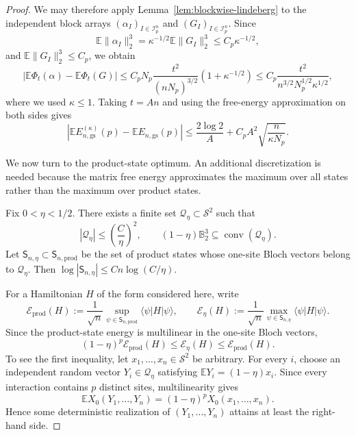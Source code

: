 \documentclass[12pt]{article}
\newcommand{\E}{\mathbb{E}}
\newcommand{\B}{\mathbb{B}}
\newcommand{\mcI}{\mathcal{I}}
\newcommand{\mcS}{\mathcal{S}}
\begin{document}
\begin{appendix}
\begin{proof}
We may therefore apply
Lemma~\ref{lem:blockwise-lindeberg} to the independent block arrays
\((\alpha_I)_{I\in\mcI_p^n}\) and
\((G_I)_{I\in\mcI_p^n}\). Since
\[
    \E\|\alpha_I\|_2^3
    =
    \kappa^{-1/2}\E\|G_I\|_2^3
    \le
    C_p\kappa^{-1/2},
\]
and \(\E\|G_I\|_2^3\le C_p\), we obtain
\[
    | \E\Phi_t(\alpha)-\E\Phi_t(G) |
    \le
    C_pN_p
    \frac{t^2}{(nN_p)^{3/2}}
    \left(1+\kappa^{-1/2}\right)
    \le
    C_p\frac{t^2}
    {n^{3/2}N_p^{1/2}\kappa^{1/2}},
\]
where we used \(\kappa\le1\). Taking \(t=An\) and using the free-energy
approximation on both sides gives
\begin{equation}
\label{eq:ground-state-expectation-transfer-bound}
\left|
    \E E_{n,\mathrm{gs}}^{(\kappa)}(p)
    -
    \E E_{n,\mathrm{gs}}(p)
\right|
\le
\frac{2\log2}{A}
+
C_pA^2
\sqrt{\frac{n}{\kappa N_p}}.
\end{equation}

We now turn to the product-state optimum. An additional discretization
is needed because the matrix free energy approximates the maximum over
all states rather than the maximum over product states.

Fix \(0<\eta<1/2\). There exists a finite set
\(\mathcal Q_\eta\subset\mcS^2\) such that
\[
    |\mathcal Q_\eta|
    \le
    \left(\frac C\eta\right)^2,
    \qquad
    (1-\eta)\B_2^3
    \subseteq
    \operatorname{conv}(\mathcal Q_\eta).
\]
Let \(\mathsf S_{n,\eta}\subset\mathsf S_{n,\mathrm{prod}}\) be the set
of product states whose one-site Bloch vectors belong to
\(\mathcal Q_\eta\). Then
\(\log|\mathsf S_{n,\eta}|\le Cn\log(C/\eta)\).

For a Hamiltonian \(H\) of the form considered here, write
\[
    \mathcal E_{\mathrm{prod}}(H)
    :=
    \frac1{\sqrt n}
    \sup_{\psi\in\mathsf S_{n,\mathrm{prod}}}
    \langle\psi|H|\psi\rangle,
    \qquad
    \mathcal E_\eta(H)
    :=
    \frac1{\sqrt n}
    \max_{\psi\in\mathsf S_{n,\eta}}
    \langle\psi|H|\psi\rangle.
\]
Since the product-state energy is multilinear in the one-site Bloch
vectors,
\[
    (1-\eta)^p\mathcal E_{\mathrm{prod}}(H)
    \le
    \mathcal E_\eta(H)
    \le
    \mathcal E_{\mathrm{prod}}(H).
\]
To see the first inequality, let \(x_1,\ldots,x_n\in\mcS^2\) be
arbitrary. For every \(i\), choose an independent random vector
\(Y_i\in\mathcal Q_\eta\) satisfying
\(\E Y_i=(1-\eta)x_i\). Since every interaction contains \(p\) distinct
sites, multilinearity gives
\[
    \E X_0(Y_1,\ldots,Y_n)
    =
    (1-\eta)^pX_0(x_1,\ldots,x_n).
\]
Hence some deterministic realization of
\((Y_1,\ldots,Y_n)\) attains at least the right-hand side.


\end{proof}
\end{appendix}
\end{document}
